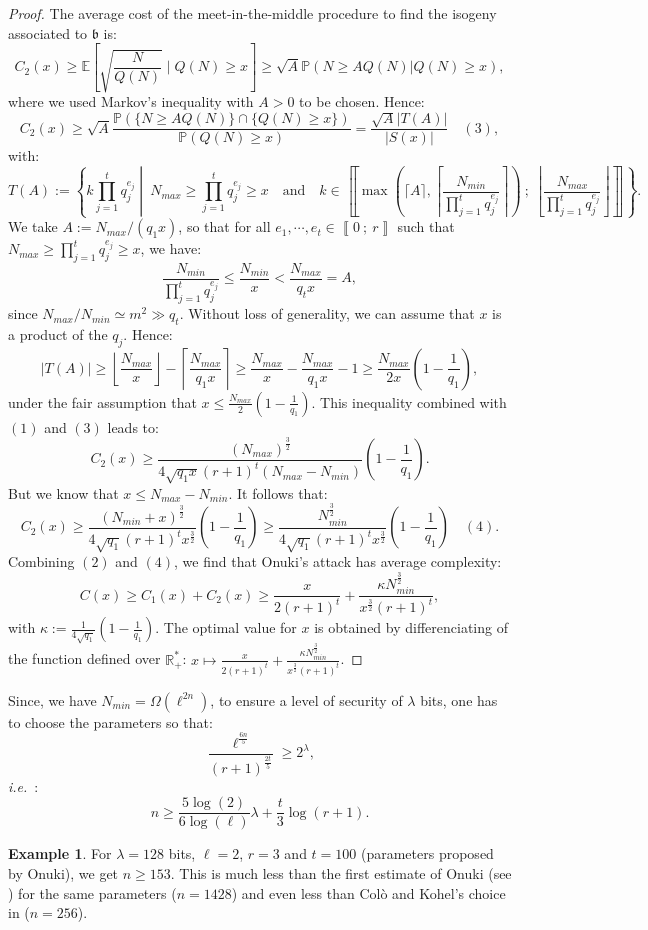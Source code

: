 \documentclass[a4paper,10pt,notitlepage]{report}
\theoremstyle{definition}
\theoremstyle{plain}
\theoremstyle{definition}
\newtheorem{Example}[Definition]{Example}
\newcommand{\ie}{\emph{i.e.}\ }
\newcommand{\R}{\mathbb{R}}
\newcommand{\E}{\mathbb{E}}
\renewcommand{\i}[2]{\left\llbracket #1~;~#2\right\rrbracket}
\renewcommand{\(}{\left(}
\renewcommand{\)}{\right)}
\renewcommand{\P}{\mathbb{P}}
\newcommand{\mf}[1]{\mathfrak{#1}}
\begin{document}
\begin{proof}
The average cost of the meet-in-the-middle procedure to find the isogeny associated to $\mf{b}$ is:
\[C_2(x)\geq \E\left[\sqrt{\frac{N}{Q(N)}}\mid Q(N)\geq x\right]\geq \sqrt{A}\P(N\geq A Q(N)|Q(N)\geq x),\]
where we used Markov's inequality with $A>0$ to be chosen. Hence:
\[C_2(x)\geq  \sqrt{A}\frac{\P(\{N\geq A Q(N)\}\cap\{Q(N)\geq x\})}{\P(Q(N)\geq x)}=\frac{\sqrt{A}|T(A)|}{|S(x)|} \quad (3),\]
with:
\[T(A):=\left\{k\prod_{j=1}^tq_j^{e_j}\middle| \ N_{max}\geq\prod_{j=1}^tq_j^{e_j}\geq x \quad \mbox{and} \quad k\in\i{\max\(\lceil A\rceil,\left\lceil\frac{N_{min}}{\prod_{j=1}^t q_j^{e_j}}\right\rceil\)}{\left\lfloor\frac{N_{max}}{\prod_{j=1}^t q_j^{e_j}}\right\rfloor}\right\}.\]
We take $A:=N_{max}/(q_1 x)$, so that for all $e_1, \cdots,e_t\in\i{0}{r}$ such that $N_{max}\geq \prod_{j=1}^tq_j^{e_j}\geq x$, we have:
\[\frac{N_{min}}{\prod_{j=1}^tq_j^{e_j}}\leq \frac{N_{min}}{x}<\frac{N_{max}}{q_tx}=A,\]
since $N_{max}/N_{min}\simeq m^2\gg q_t$. Without loss of generality, we can assume that $x$ is a product of the $q_j$. Hence:
\[|T(A)|\geq\left\lfloor\frac{N_{max}}{x}\right\rfloor-\left\lceil\frac{N_{max}}{q_1x}\right\rceil\geq \frac{N_{max}}{x}-\frac{N_{max}}{q_1x}-1\geq\frac{N_{max}}{2x}\(1-\frac{1}{q_1}\),\]
under the fair assumption that $x\leq \frac{N_{max}}{2}\(1-\frac{1}{q_1}\)$. This inequality combined with $(1)$ and $(3)$ leads to:
\[C_2(x)\geq \frac{(N_{max})^{\frac{3}{2}}}{4\sqrt{q_1 x}(r+1)^t(N_{max}-N_{min})}\(1-\frac{1}{q_1}\).\]
But we know that $x\leq N_{max}-N_{min}$. It follows that:
\[C_2(x)\geq  \frac{(N_{min}+x)^{\frac{3}{2}}}{4\sqrt{q_1}(r+1)^tx^{\frac{3}{2}}}\(1-\frac{1}{q_1}\)\geq \frac{N_{min}^{\frac{3}{2}}}{4\sqrt{q_1}(r+1)^tx^{\frac{3}{2}}}\(1-\frac{1}{q_1}\)\quad (4).\]
Combining $(2)$ and $(4)$, we find that Onuki's attack has average complexity:
\[C(x)\geq C_1(x)+C_2(x)\geq  \frac{x}{2(r+1)^t}+\frac{\kappa N_{min}^{\frac{3}{2}}}{x^{\frac{3}{2}}(r+1)^t},\]
with $\kappa:=\frac{1}{4\sqrt{q_1}}\(1-\frac{1}{q_1}\)$. The optimal value for $x$ is obtained by differenciating of the function defined over $\R_+^*$:  $x\longmapsto \frac{x}{2(r+1)^t}+\frac{\kappa N_{min}^{\frac{3}{2}}}{x^{\frac{3}{2}}(r+1)^t}$.
\end{proof}

Since, we have $N_{min}=\Omega(\ell^{2n})$, to ensure a level of security of $\lambda$ bits, one has to choose the parameters so that:
\[\frac{\ell^{\frac{6n}{5}}}{(r+1)^{\frac{2t}{5}}}\geq 2^\lambda,\]
\ie:
\[n\geq \frac{5\log(2)}{6\log(\ell)}\lambda+\frac{t}{3}\log(r+1).\]

\begin{Example}
For $\lambda=128$ bits, $\ell=2$, $r=3$ and $t=100$ (parameters proposed by Onuki), we get $n\geq 153$. This is much less than the first estimate of Onuki (see \cite[§ 6.3]{Onuki}) for the same parameters ($n=1428$) and even less than Col\`{o} and Kohel's choice in \cite[Section 6]{OSIDH} ($n=256$).
\end{Example}
\end{document}
